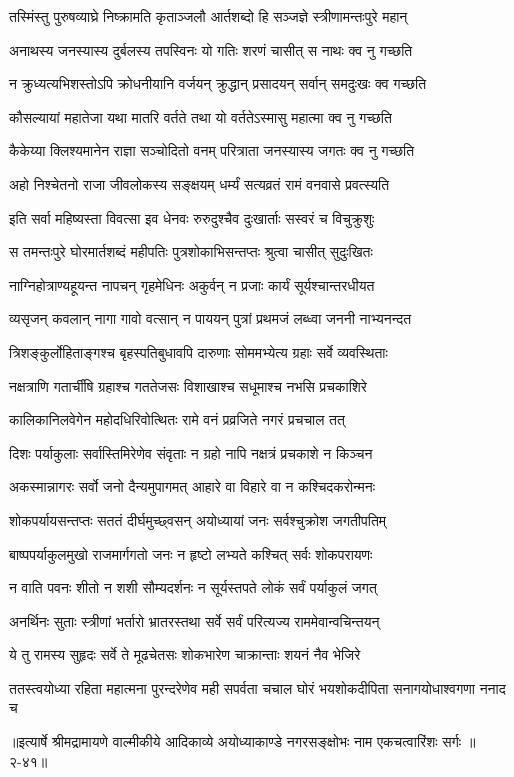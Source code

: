
\twolineshloka
{तस्मिंस्तु पुरुषव्याघ्रे निष्क्रामति कृताञ्जलौ}
{आर्तशब्दो हि सञ्जज्ञे स्त्रीणामन्तःपुरे महान्} %

\twolineshloka
{अनाथस्य जनस्यास्य दुर्बलस्य तपस्विनः}
{यो गतिः शरणं चासीत् स नाथः क्व नु गच्छति} %

\twolineshloka
{न क्रुध्यत्यभिशस्तोऽपि क्रोधनीयानि वर्जयन्}
{क्रुद्धान् प्रसादयन् सर्वान् समदुःखः क्व गच्छति} %

\twolineshloka
{कौसल्यायां महातेजा यथा मातरि वर्तते}
{तथा यो वर्ततेऽस्मासु महात्मा क्व नु गच्छति} %

\twolineshloka
{कैकेय्या क्लिश्यमानेन राज्ञा सञ्चोदितो वनम्}
{परित्राता जनस्यास्य जगतः क्व नु गच्छति} %

\twolineshloka
{अहो निश्चेतनो राजा जीवलोकस्य सङ्क्षयम्}
{धर्म्यं सत्यव्रतं रामं वनवासे प्रवत्स्यति} %

\twolineshloka
{इति सर्वा महिष्यस्ता विवत्सा इव धेनवः}
{रुरुदुश्चैव दुःखार्ताः सस्वरं च विचुक्रुशुः} %

\twolineshloka
{स तमन्तःपुरे घोरमार्तशब्दं महीपतिः}
{पुत्रशोकाभिसन्तप्तः श्रुत्वा चासीत् सुदुःखितः} %

\twolineshloka
{नाग्निहोत्राण्यहूयन्त नापचन् गृहमेधिनः}
{अकुर्वन् न प्रजाः कार्यं सूर्यश्चान्तरधीयत} %

\twolineshloka
{व्यसृजन् कवलान् नागा गावो वत्सान् न पाययन्}
{पुत्रां प्रथमजं लब्ध्वा जननी नाभ्यनन्दत} %

\twolineshloka
{त्रिशङ्कुर्लोहिताङ्गश्च बृहस्पतिबुधावपि}
{दारुणाः सोममभ्येत्य ग्रहाः सर्वे व्यवस्थिताः} %

\twolineshloka
{नक्षत्राणि गतार्चींषि ग्रहाश्च गततेजसः}
{विशाखाश्च सधूमाश्च नभसि प्रचकाशिरे} %

\twolineshloka
{कालिकानिलवेगेन महोदधिरिवोत्थितः}
{रामे वनं प्रव्रजिते नगरं प्रचचाल तत्} %

\twolineshloka
{दिशः पर्याकुलाः सर्वास्तिमिरेणेव संवृताः}
{न ग्रहो नापि नक्षत्रं प्रचकाशे न किञ्चन} %

\twolineshloka
{अकस्मान्नागरः सर्वो जनो दैन्यमुपागमत्}
{आहारे वा विहारे वा न कश्चिदकरोन्मनः} %

\twolineshloka
{शोकपर्यायसन्तप्तः सततं दीर्घमुच्छ्वसन्}
{अयोध्यायां जनः सर्वश्चुक्रोश जगतीपतिम्} %

\twolineshloka
{बाष्पपर्याकुलमुखो राजमार्गगतो जनः}
{न हृष्टो लभ्यते कश्चित् सर्वः शोकपरायणः} %

\twolineshloka
{न वाति पवनः शीतो न शशी सौम्यदर्शनः}
{न सूर्यस्तपते लोकं सर्वं पर्याकुलं जगत्} %

\twolineshloka
{अनर्थिनः सुताः स्त्रीणां भर्तारो भ्रातरस्तथा}
{सर्वे सर्वं परित्यज्य राममेवान्वचिन्तयन्} %

\twolineshloka
{ये तु रामस्य सुहृदः सर्वे ते मूढचेतसः}
{शोकभारेण चाक्रान्ताः शयनं नैव भेजिरे} %

\twolineshloka
{ततस्त्वयोध्या रहिता महात्मना पुरन्दरेणेव मही सपर्वता}
{चचाल घोरं भयशोकदीपिता सनागयोधाश्वगणा ननाद च} %


॥इत्यार्षे श्रीमद्रामायणे वाल्मीकीये आदिकाव्ये अयोध्याकाण्डे नगरसङ्क्षोभः नाम एकचत्वारिंशः सर्गः ॥२-४१॥

